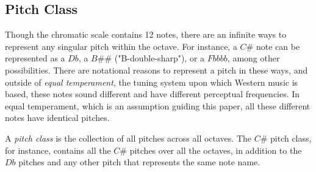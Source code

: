 \subsection{Pitch Class}

Though the chromatic scale contains 12 notes, there are an infinite ways to represent any singular pitch within the octave. For instance, a $C\#$ note can be represented as a $Db$, a $B\#\#$ ("B-double-sharp"), or a $Fbbbb$, among other possibilities. There are notational reasons to represent a pitch in these ways, and outside of \textit{equal temperament}, the tuning system upon which Western music is based, these notes sound different and have different perceptual frequencies. In equal temperament, which is an assumption guiding this paper, all these different notes have identical pitches.

A \textit{pitch class} is the collection of all pitches across all octaves. The $C\#$ pitch class, for instance, contains all the $C\#$ pitches over all the octaves, in addition to the $Db$ pitches and any other pitch that represents the same note name.